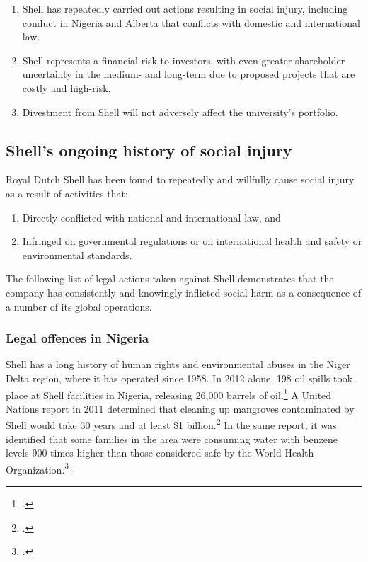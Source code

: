 \begin{enumerate}
	\item Shell has repeatedly carried out actions resulting in social injury, including conduct in Nigeria and Alberta that conflicts with domestic and international law.
	\item Shell represents a financial risk to investors, with even greater shareholder uncertainty in the medium- and long-term due to proposed projects that are costly and high-risk.
	\item Divestment from Shell will not adversely affect the university's portfolio.
\end{enumerate}



	\subsection{Shell's ongoing history of social injury}



Royal Dutch Shell has been found to repeatedly and willfully cause social injury as a result of activities that:
\begin{enumerate}
	\item Directly conflicted with national and international law, and
	\item Infringed on governmental regulations or on international health and safety or environmental standards. 
\end{enumerate}
The following list of legal actions taken against Shell demonstrates that the company has consistently and knowingly inflicted social harm as a consequence of a number of its global operations.



	\subsubsection{Legal offences in Nigeria}



Shell has a long history of human rights and environmental abuses in the Niger Delta region, where it has operated since 1958.
In 2012 alone, 198 oil spills took place at Shell facilities in Nigeria, releasing 26,000 barrels of oil.\footcite{DutchResponsible}
A United Nations report in 2011 determined that cleaning up mangroves contaminated by Shell would take 30 years and at least \$1 billion.\footcite{Ogoniland}
In the same report, it was identified that some families in the area were consuming water with benzene levels 900 times higher than those considered safe by the World Health Organization.\footcite{OilSpoils}



